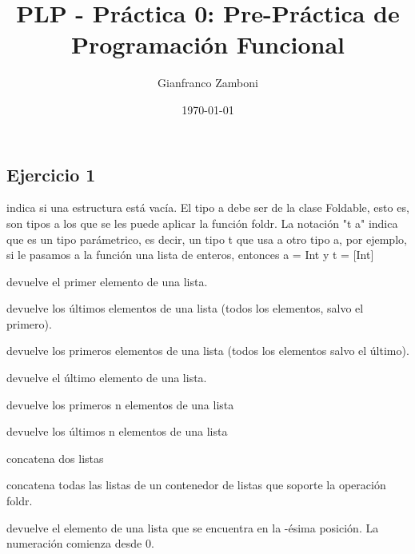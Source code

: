 \documentclass[10pt,a4paper]{article}
\begin{document}
\title{PLP - Práctica 0: Pre-Práctica de Programación Funcional}

\date{\today}

\author{Gianfranco Zamboni}

\maketitle
\setcounter{page}{1}

\subsection{Ejercicio 1}
 indica si una estructura está vacía. El tipo a debe ser de la clase Foldable, esto es, son tipos a los que se les puede aplicar la función foldr. La notación "t a" indica que es un tipo parámetrico, es decir, un tipo t que usa a otro tipo a, por ejemplo, si le pasamos a la función una lista de enteros, entonces a = Int y t = [Int]

\vspace*{5mm}
 devuelve el primer elemento de una lista.

\vspace*{5mm}
 devuelve los últimos elementos de una lista (todos los elementos, salvo el primero).

\vspace*{5mm}
 devuelve los primeros elementos de una lista (todos los elementos salvo el último).

\vspace*{5mm}
 devuelve el último elemento de una lista.


\vspace*{5mm}
 devuelve los primeros n elementos de una lista

\vspace*{5mm}
 devuelve los últimos n elementos de una lista

\vspace*{5mm}
\haskell{(++) :: [a] -> [a] -> [a]} concatena dos listas

\vspace*{5mm}
 concatena todas las listas de un contenedor de listas que soporte la operación foldr.

\vspace*{5mm}
 devuelve el elemento de una lista 
 que se encuentra en la -ésima posición. La numeración comienza desde 0.
\end{document}
